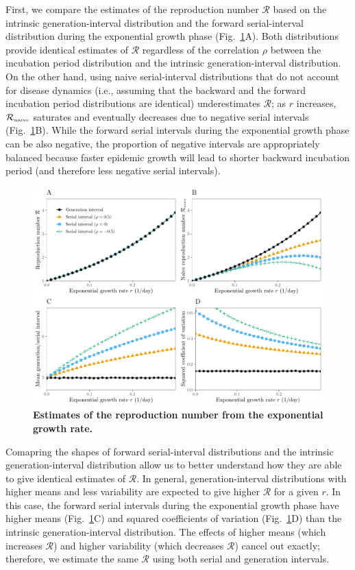\documentclass[12pt]{article}
\newcommand{\fref}[1]{Fig.~\ref{fig:#1}}
\begin{document}
First, we compare the estimates of the reproduction number $\mathcal R$ based on the intrinsic generation-interval distribution and the forward serial-interval distribution during the exponential growth phase (\fref{rR}A).
Both distributions provide identical estimates of $\mathcal R$ regardless of the correlation $\rho$ between the incubation period distribution and the intrinsic generation-interval distribution.
On the other hand, using naive serial-interval distributions that do not account for disease dynamics (i.e., assuming that the backward and the forward incubation period distributions are identical) underestimates $\mathcal R$;
as $r$ increases, ${\mathcal R}_{\textrm{\tiny naive}}$ saturates and eventually decreases due to negative serial intervals (\fref{rR}B).
While the forward serial intervals during the exponential growth phase can be also negative, the proportion of negative intervals are appropriately balanced because faster epidemic growth will lead to shorter backward incubation period (and therefore less negative serial intervals).

\begin{figure}[!th]
\includegraphics[width=\textwidth]{rR.pdf}
\caption{
\textbf{Estimates of the reproduction number from the exponential growth rate.}
}
\label{fig:rR}
\end{figure}

Comapring the shapes of forward serial-interval distributions and the intrinsic generation-interval distribution allow us to better understand how they are able to give identical estimates of $\mathcal R$.
In general, generation-interval distributions with higher means and less variability are expected to give higher $\mathcal R$ for a given $r$.
In this case, the forward serial intervals during the exponential growth phase have higher means (\fref{rR}C) and squared coefficients of variation (\fref{rR}D) than the intrinsic generation-interval distribution.
The effects of higher means (which increases $\mathcal R$) and higher variability (which decreases $\mathcal R$) cancel out exactly;
therefore, we estimate the same $\mathcal R$ using both serial and generation intervals.
\end{document}
